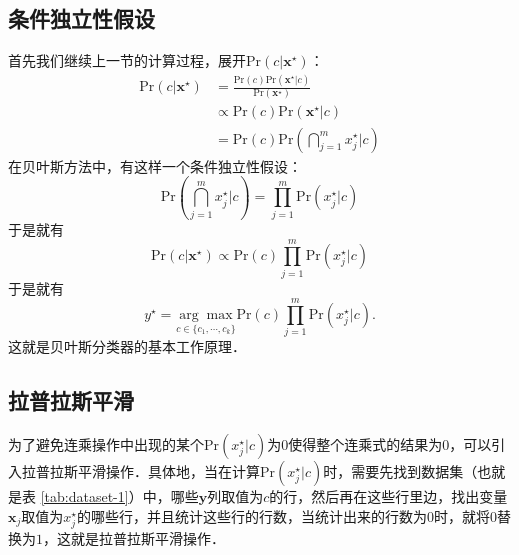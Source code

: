 \documentclass{ctexart}
\newcommand{\pr}{\mathrm{Pr}}
\begin{document}
    \subsection{条件独立性假设}
    首先我们继续上一节的计算过程，展开$\pr(c|\boldsymbol{x}^\star)$：
    \begin{align}
        \pr(c|\boldsymbol{x}^\star) &= \frac{\pr(c) \pr(\boldsymbol{x}^\star | c)}{\pr(\boldsymbol{x}^\star)} \\
        &\propto \pr(c) \pr(\boldsymbol{x}^\star | c) \\
        &= \pr(c)\pr(\bigcap_{j=1}^{m}x_{j}^\star|c)
    \end{align}
    在贝叶斯方法中，有这样一个条件独立性假设：
    \begin{equation}
        \pr(\bigcap_{j=1}^{m} x_{j}^\star|c) = \prod_{j=1}^m \pr(x_{j}^\star|c)
    \end{equation}
    于是就有
    \begin{equation}
        \pr(c|\boldsymbol{x}^\star) \propto \pr(c) \prod_{j=1}^{m} \pr(x_{j}^\star | c)
    \end{equation}
    于是就有
    \begin{equation}
        y^\star = \underset{c \in \{c_1,\cdots,c_k\}}{\arg\max} \pr(c) \prod_{j=1}^{m} \pr(x_{j}^\star | c).
    \end{equation}
    这就是贝叶斯分类器的基本工作原理．

    \subsection{拉普拉斯平滑}
    为了避免连乘操作中出现的某个$\pr(x_j^\star|c)$为$0$使得整个连乘式的结果为$0$，可以引入拉普拉斯平滑操作．具体地，当在计算$\pr(x_j^\star|c)$时，需要先找到数据集（也就是表 \ref{tab:dataset-1}）中，哪些$\boldsymbol{y}$列取值为$c$的行，然后再在这些行里边，找出变量$\boldsymbol{x}_j$取值为$x_j^\star$的哪些行，并且统计这些行的行数，当统计出来的行数为$0$时，就将$0$替换为$1$，这就是拉普拉斯平滑操作．
\end{document}
